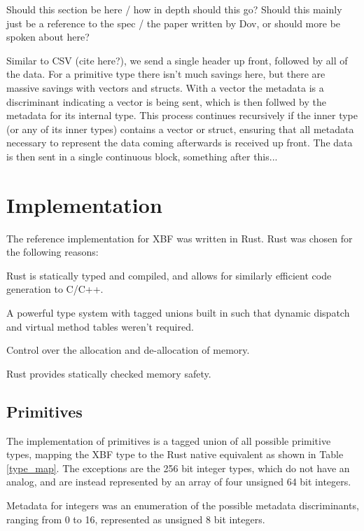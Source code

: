 \documentclass[conference]{IEEEtran}
\begin{document}
Should this section be here / how in depth should this go? Should this mainly just be a reference to the spec / the paper written by Dov, or should more be spoken about here?

Similar to CSV (cite here?), we send a single header up front, followed by all of the data. For a primitive type there isn't much savings here, but there are massive savings with vectors and structs. With a vector the metadata is a discriminant indicating a vector is being sent, which is then follwed by the metadata for its internal type. This process continues recursively if the inner type (or any of its inner types) contains a vector or struct, ensuring that all metadata necessary to represent the data coming afterwards is received up front. The data is then sent in a single continuous block, something after this...

\section{Implementation}

The reference implementation for XBF\cite{xbf_impl} was written in Rust. Rust was chosen for the following reasons:
\begin{IEEEitemize}
	\item Rust is statically typed and compiled, and allows for similarly efficient code generation to C/C++.
	\item A powerful type system with tagged unions built in such that dynamic dispatch and virtual method tables weren't required.
	\item Control over the allocation and de-allocation of memory.
	\item Rust provides statically checked memory safety.
\end{IEEEitemize}

\subsection{Primitives}

The implementation of primitives is a tagged union of all possible primitive types, mapping the XBF type to the Rust native equivalent as shown in Table \ref{type_map}. The exceptions are the 256 bit integer types, which do not have an analog, and are instead represented by an array of four unsigned 64 bit integers.

Metadata for integers was an enumeration of the possible metadata discriminants, ranging from 0 to 16, represented as unsigned 8 bit integers.
\end{document}
